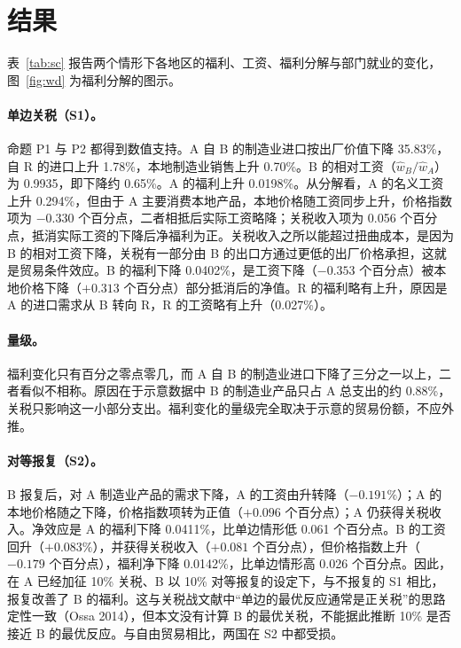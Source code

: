 \documentclass[11pt,a4paper]{ctexart}
\begin{document}
\section{结果}

表~\ref{tab:sc} 报告两个情形下各地区的福利、工资、福利分解与部门就业的变化，图~\ref{fig:wd} 为福利分解的图示。

\begin{table}[h]
\centering\small
\caption{两个情形下的主要结果（相对基期，\%；示意数据）。福利为实际吸收变化；工资为名义工资变化；关税收入项与价格指数项为式 (4) 中的分解项（对数近似，×100）；就业为部门就业变化}\label{tab:sc}

\end{table}

\paragraph{单边关税（S1）。} 命题 P1 与 P2 都得到数值支持。A 自 B 的制造业进口按出厂价值下降 35.83\%，自 R 的进口上升 1.78\%，本地制造业销售上升 0.70\%。B 的相对工资（$\hat w_B/\hat w_A$）为 0.9935，即下降约 0.65\%。A 的福利上升 0.0198\%。从分解看，A 的名义工资上升 0.294\%，但由于 A 主要消费本地产品，本地价格随工资同步上升，价格指数项为 $-0.330$ 个百分点，二者相抵后实际工资略降；关税收入项为 0.056 个百分点，抵消实际工资的下降后净福利为正。关税收入之所以能超过扭曲成本，是因为 B 的相对工资下降，关税有一部分由 B 的出口方通过更低的出厂价格承担，这就是贸易条件效应。B 的福利下降 0.0402\%，是工资下降（$-0.353$ 个百分点）被本地价格下降（$+0.313$ 个百分点）部分抵消后的净值。R 的福利略有上升，原因是 A 的进口需求从 B 转向 R，R 的工资略有上升（0.027\%）。

\paragraph{量级。} 福利变化只有百分之零点零几，而 A 自 B 的制造业进口下降了三分之一以上，二者看似不相称。原因在于示意数据中 B 的制造业产品只占 A 总支出的约 0.88\%，关税只影响这一小部分支出。福利变化的量级完全取决于示意的贸易份额，不应外推。

\paragraph{对等报复（S2）。} B 报复后，对 A 制造业产品的需求下降，A 的工资由升转降（$-0.191\%$）；A 的本地价格随之下降，价格指数项转为正值（$+0.096$ 个百分点）；A 仍获得关税收入。净效应是 A 的福利下降 0.0411\%，比单边情形低 0.061 个百分点。B 的工资回升（$+0.083\%$），并获得关税收入（$+0.081$ 个百分点），但价格指数上升（$-0.179$ 个百分点），福利净下降 0.0142\%，比单边情形高 0.026 个百分点。因此，在 A 已经加征 10\% 关税、B 以 10\% 对等报复的设定下，与不报复的 S1 相比，报复改善了 B 的福利。这与关税战文献中“单边的最优反应通常是正关税”的思路定性一致（Ossa 2014），但本文没有计算 B 的最优关税，不能据此推断 10\% 是否接近 B 的最优反应。与自由贸易相比，两国在 S2 中都受损。
\end{document}
